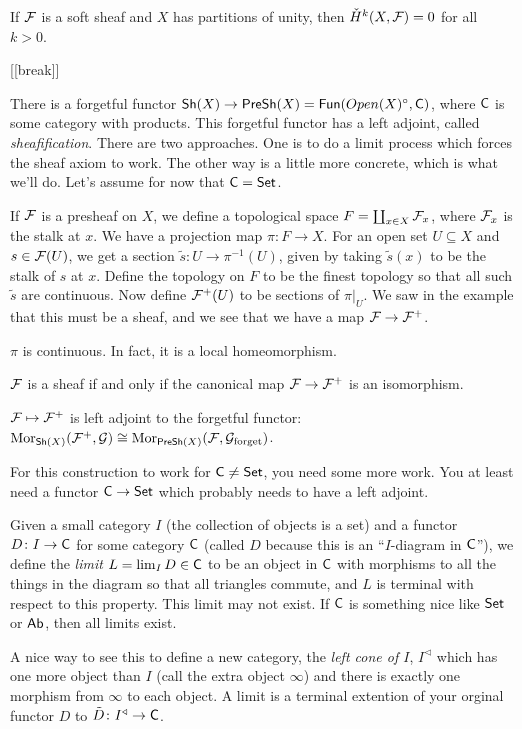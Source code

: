 \begin{lemma}
 If $\mathcal{F}$ is a soft sheaf and $X$ has partitions of unity, then $\check H^k(X,\mathcal{F})=0$ for all $k>0$.
\end{lemma}

[[break]]

There is a forgetful functor $\operatorname{\sf Sh}(X)\to \operatorname{\sf PreSh}(X)=\text{\sf Fun}(Open(X)^\circ, \text{\sf C})$, where $\text{\sf C}$ is some category with products. This forgetful functor has a left adjoint, called \emph{sheafification}. There are two approaches. One is to do a limit process which forces the sheaf axiom to work. The other way is a little more concrete, which is what we'll do. Let's assume for now that $\text{\sf C}=\operatorname{\sf Set}$.

If $\mathcal{F}$ is a presheaf on $X$, we define a topological space $F=\coprod_{x\in X} \mathcal{F}_x$, where $\mathcal{F}_x$ is the stalk at $x$. We have a projection map $\pi\colon F\to X$. For an open set $U\subseteq X$ and $s\in \mathcal{F}(U)$, we get a section $\tilde s\colon U\to \pi^{-1}(U)$, given by taking $\tilde s(x)$ to be the stalk of $s$ at $x$. Define the topology on $F$ to be the finest topology so that all such $\tilde s$ are continuous. Now define $\mathcal{F}^+(U)$ to be sections of $\pi|_U$. We saw in the example that this must be a sheaf, and we see that we have a map $\mathcal{F}\to \mathcal{F}^+$.
\begin{lemma}
 $\pi$ is continuous. In fact, it is a local homeomorphism.
\end{lemma}
\begin{lemma}
 $\mathcal{F}$ is a sheaf if and only if the canonical map $\mathcal{F}\to \mathcal{F}^+$ is an isomorphism.
\end{lemma}
\begin{lemma}
 $\mathcal{F}\mapsto \mathcal{F}^+$ is left adjoint to the forgetful functor: $\operatorname{Mor}_{\operatorname{\sf Sh}(X)}(\mathcal{F}^+,\mathcal{G})\cong \operatorname{Mor}_{\operatorname{\sf PreSh}(X)}(\mathcal{F},\mathcal{G}_{\text{forget}})$.
\end{lemma}

For this construction to work for $\text{\sf C}\neq\operatorname{\sf Set}$, you need some more work. You at least need a functor $\text{\sf C}\to \operatorname{\sf Set}$ which probably needs to have a left adjoint.

Given a small category $I$ (the collection of objects is a set) and a functor $D\colon I\to \text{\sf C}$ for some category $\text{\sf C}$ (called $D$ because this is an ``$I$-diagram in $\text{\sf C}$''), we define the \emph{limit} $L=\lim_I D\in \text{\sf C}$ to be an object in $\text{\sf C}$ with morphisms to all the things in the diagram so that all triangles commute, and $L$ is terminal with respect to this property. This limit may not exist. If $\text{\sf C}$ is something nice like $\operatorname{\sf Set}$ or $\text{\sf Ab}$, then all limits exist.

A nice way to see this to define a new category, the \emph{left cone of $I$}, $I^\triangleleft$ which has one more object than $I$ (call the extra object $\infty$) and there is exactly one morphism from $\infty$ to each object. A limit is a terminal extention of your orginal functor $D$ to $\tilde D\colon I^\triangleleft\to \text{\sf C}$.



